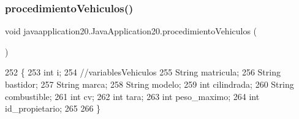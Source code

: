 \mbox{\label{classjavaapplication20_1_1_java_application20_af1bd8f612fa222da9ade17b155b54cc4}} 
\subsubsection{\texorpdfstring{procedimiento\+Vehiculos()}{procedimientoVehiculos()}}
{\footnotesize\ttfamily void javaapplication20.\+Java\+Application20.\+procedimiento\+Vehiculos (\begin{DoxyParamCaption}{ }\end{DoxyParamCaption})\hspace{0.3cm}{\ttfamily [inline]}}


\begin{DoxyCode}
252     \{
253         \textcolor{keywordtype}{int} i;
254         \textcolor{comment}{//variablesVehiculos}
255         String matricula;
256         String bastidor;
257         String marca;
258         String modelo;
259         \textcolor{keywordtype}{int} cilindrada;
260         String combustible;
261         \textcolor{keywordtype}{int} cv;
262         \textcolor{keywordtype}{int} tara;
263         \textcolor{keywordtype}{int} peso\_maximo;
264         \textcolor{keywordtype}{int} id\_propietario;
265         
266     \}
\end{DoxyCode}
